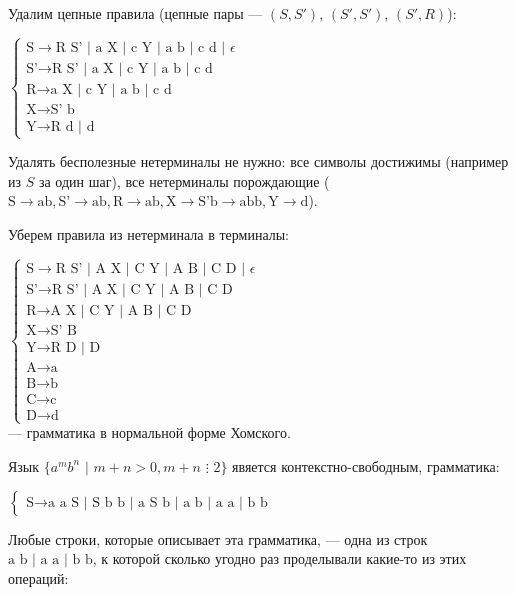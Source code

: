 \documentclass[12pt,a4paper]{scrartcl}
\begin{document}
\begin{description}
	
	Удалим цепные правила (цепные пары --- $(S, S')$, $(S', S')$, $(S', R)$):
	
	$\begin{cases}
	\text{S} \rightarrow \text{R S' | a X | c Y | a b | c d | } \epsilon\\
	\text{S'} \rightarrow \text{R S' | a X | c Y | a b | c d } \\
	\text{R} \rightarrow \text{a X | c Y | a b | c d}\\
	\text{X} \rightarrow \text{S' b}\\
	\text{Y} \rightarrow \text{R d | d}
	\end{cases}$	
	
	Удалять бесполезные нетерминалы не нужно: все символы достижимы (например из $S$ за один шаг), все нетерминалы порождающие ($\text{S} \rightarrow \text{ab}, \text{S'} \rightarrow \text{ab}, \text{R} \rightarrow \text{ab}, \text{X} \rightarrow \text{S'b} \rightarrow \text{abb}, \text{Y} \rightarrow \text{d}$).
	
	Уберем правила из нетерминала в терминалы:
	
	$\begin{cases}
	\text{S} \rightarrow \text{R S' | A X | C Y | A B | C D | } \epsilon\\
	\text{S'} \rightarrow \text{R S' | A X | C Y | A B | C D } \\
	\text{R} \rightarrow \text{A X | C Y | A B | C D}\\
	\text{X} \rightarrow \text{S' B}\\
	\text{Y} \rightarrow \text{R D | D}\\
	\text{A} \rightarrow \text{a}\\
	\text{B} \rightarrow \text{b}\\
	\text{C} \rightarrow \text{c}\\
	\text{D} \rightarrow \text{d}
	\end{cases}$ \\--- грамматика в нормальной форме Хомского.


	\item[\fbox{3.}] Язык $\{ a^m b^n\,\,|\,\,m + n > 0, m + n\,\,\vdots\,\, 2 \}$ явяется контекстно-свободным, грамматика:
	
	$\begin{cases}
		\text{S} \rightarrow \text{a a S | S b b | a S b | a b | a a | b b}
	\end{cases}$
	
	Любые строки, которые описывает эта грамматика, --- одна из строк $\text{a b | a a | b b}$, к которой сколько угодно раз проделывали какие-то из этих операций:
	

\end{description}
\end{document}

